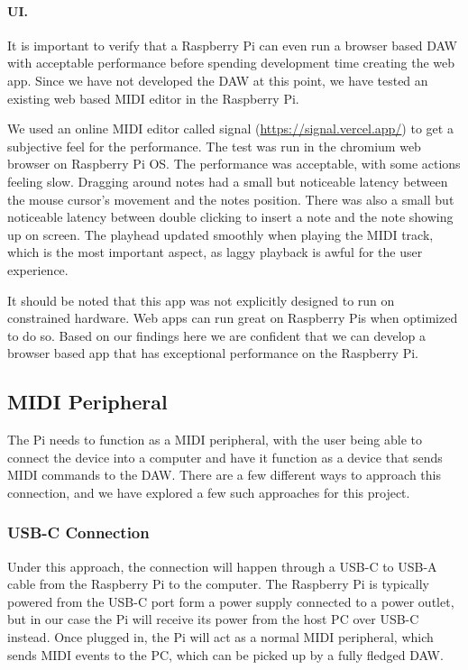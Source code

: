 \paragraph{UI.} It is important to verify that a Raspberry Pi can even run a browser based
DAW with acceptable performance before spending development time creating the web app.
Since we have not developed the DAW at this point, we have tested an existing web based
MIDI editor in the Raspberry Pi.

We used an online MIDI editor called signal (\url{https://signal.vercel.app/}) to get a
subjective feel for the performance. The test was run in the chromium web browser on
Raspberry Pi OS. The performance was acceptable, with some actions feeling slow.
Dragging around notes had a small but noticeable latency between the mouse cursor's
movement and the notes position. There was also a small but noticeable latency between
double clicking to insert a note and the note showing up on screen. The playhead updated
smoothly when playing the MIDI track, which is the most important aspect, as laggy
playback is awful for the user experience.

It should be noted that this app was not explicitly designed to run on constrained
hardware. Web apps can run great on Raspberry Pis when optimized to do so. Based on our
findings here we are confident that we can develop a browser based app that has
exceptional performance on the Raspberry Pi.

\subsection{MIDI Peripheral}
\label{sec:midi_peripheral}

The Pi needs to function as a MIDI peripheral, with the user being able to connect the
device into a computer and have it function as a device that sends MIDI commands to the
DAW. There are a few different ways to approach this connection, and we have explored a
few such approaches for this project.


\subsubsection{USB-C Connection}

Under this approach, the connection will happen through a USB-C to USB-A cable from the
Raspberry Pi to the computer. The Raspberry Pi is typically powered from the USB-C port
form a power supply connected to a power outlet, but in our case the Pi will receive its
power from the host PC over USB-C instead. Once plugged in, the Pi will act as a normal
MIDI peripheral, which sends MIDI events to the PC, which can be picked up by a fully
fledged DAW.


